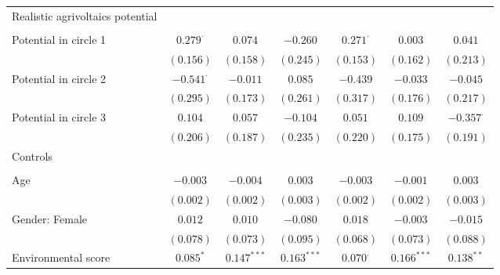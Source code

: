 \begin{center}
\begin{small}
\begin{longtable}{l@{} c@{} c@{} c@{} c@{} c@{} c@{}}
Realistic agrivoltaics potential    &                  &               &               &                 &               &                  \\
                                    &                  &               &               &                 &               &                  \\
\quad Potential in circle 1         & $0.279^{\cdot}$  & $0.074$       & $-0.260$      & $0.271^{\cdot}$ & $0.003$       & $0.041$          \\
                                    & $(0.156)$        & $(0.158)$     & $(0.245)$     & $(0.153)$       & $(0.162)$     & $(0.213)$        \\
\quad Potential in circle 2         & $-0.541^{\cdot}$ & $-0.011$      & $0.085$       & $-0.439$        & $-0.033$      & $-0.045$         \\
                                    & $(0.295)$        & $(0.173)$     & $(0.261)$     & $(0.317)$       & $(0.176)$     & $(0.217)$        \\
\quad Potential in circle 3         & $0.104$          & $0.057$       & $-0.104$      & $0.051$         & $0.109$       & $-0.357^{\cdot}$ \\
                                    & $(0.206)$        & $(0.187)$     & $(0.235)$     & $(0.220)$       & $(0.175)$     & $(0.191)$        \\
Controls                            &                  &               &               &                 &               &                  \\
                                    &                  &               &               &                 &               &                  \\
\quad Age                           & $-0.003$         & $-0.004$      & $0.003$       & $-0.003$        & $-0.001$      & $0.003$          \\
                                    & $(0.002)$        & $(0.002)$     & $(0.003)$     & $(0.002)$       & $(0.002)$     & $(0.003)$        \\
\quad Gender: Female                & $0.012$          & $0.010$       & $-0.080$      & $0.018$         & $-0.003$      & $-0.015$         \\
                                    & $(0.078)$        & $(0.073)$     & $(0.095)$     & $(0.068)$       & $(0.073)$     & $(0.088)$        \\
\quad Environmental score           & $0.085^{*}$      & $0.147^{***}$ & $0.163^{***}$ & $0.070^{\cdot}$ & $0.166^{***}$ & $0.138^{**}$     \\

\end{longtable}
\end{small}
\end{center}
